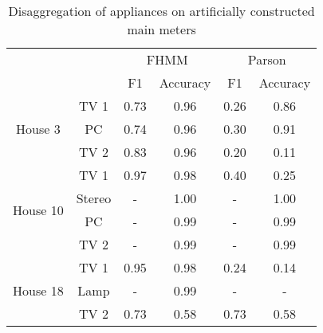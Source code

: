 \begin{table}[H]                             
\centering                                   
\begin{tabular}{cc|c|c|c|c|}
\cline{3-6}
                                                &        & \multicolumn{2}{c|}{FHMM} & \multicolumn{2}{c|}{Parson} \\ \cline{3-6} 
                                                &        & F1        & Accuracy      & F1         & Accuracy       \\ \hline
\multicolumn{1}{|c|}{\multirow{3}{*}{House 3}}  & TV 1   & 0.73      & 0.96          & 0.26       & 0.86           \\ \cline{2-6} 
\multicolumn{1}{|c|}{}                          & PC     & 0.74      & 0.96          & 0.30       & 0.91           \\ \cline{2-6} 
\multicolumn{1}{|c|}{}                          & TV 2   & 0.83      & 0.96          & 0.20       & 0.11           \\ \hline
\multicolumn{1}{|c|}{\multirow{4}{*}{House 10}} & TV 1   & 0.97      & 0.98          & 0.40       & 0.25           \\ \cline{2-6} 
\multicolumn{1}{|c|}{}                          & Stereo & -         & 1.00          & -          & 1.00           \\ \cline{2-6} 
\multicolumn{1}{|c|}{}                          & PC     & -         & 0.99          & -          & 0.99           \\ \cline{2-6} 
\multicolumn{1}{|c|}{}                          & TV 2   & -         & 0.99          & -          & 0.99           \\ \hline
\multicolumn{1}{|c|}{\multirow{3}{*}{House 18}} & TV 1   & 0.95      & 0.98          & 0.24       & 0.14           \\ \cline{2-6} 
\multicolumn{1}{|c|}{}                          & Lamp   & -         & 0.99          & -          & -              \\ \cline{2-6} 
\multicolumn{1}{|c|}{}                          & TV 2   & 0.73      & 0.58          & 0.73       & 0.58           \\ \hline
\end{tabular}                              
\caption{Disaggregation of appliances on artificially constructed main meters }                     
\label{table:Tab:SHGSIM}                     
\end{table} 